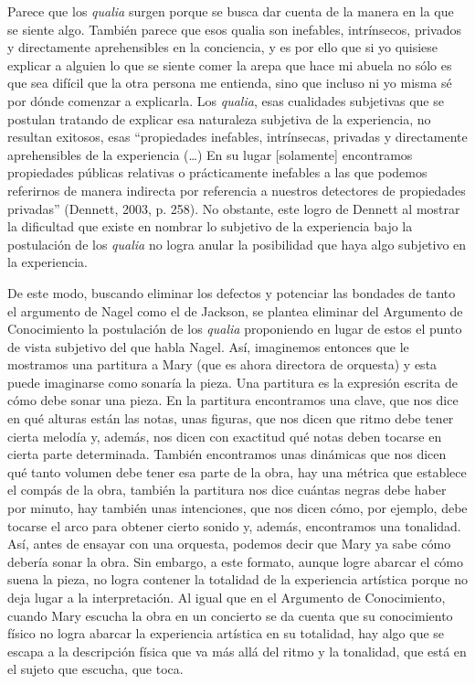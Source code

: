 \documentclass[]{book}
\begin{document}
\begin{refsection}
Parece que los \emph{qualia} surgen porque se busca dar cuenta de la
manera en la que se siente algo. También parece que esos qualia son
inefables, intrínsecos, privados y directamente aprehensibles en la
conciencia, y es por ello que si yo quisiese explicar a alguien lo que
se siente comer la arepa que hace mi abuela no sólo es que sea difícil
que la otra persona me entienda, sino que incluso ni yo misma sé por
dónde comenzar a explicarla. Los \emph{qualia}, esas cualidades
subjetivas que se postulan tratando de explicar esa naturaleza subjetiva
de la experiencia, no resultan exitosos, esas ``propiedades inefables,
intrínsecas, privadas y directamente aprehensibles de la experiencia
(\ldots{}) En su lugar {[}solamente{]} encontramos propiedades públicas
relativas o prácticamente inefables a las que podemos referirnos de
manera indirecta por referencia a nuestros detectores de propiedades
privadas'' (Dennett, 2003, p. 258). No obstante, este logro de Dennett
al mostrar la dificultad que existe en nombrar lo subjetivo de la
experiencia bajo la postulación de los \emph{qualia} no logra anular la
posibilidad que haya algo subjetivo en la experiencia.

De este modo, buscando eliminar los defectos y potenciar las bondades de
tanto el argumento de Nagel como el de Jackson, se plantea eliminar del
Argumento de Conocimiento la postulación de los \emph{qualia}
proponiendo en lugar de estos el punto de vista subjetivo del que habla
Nagel. Así, imaginemos entonces que le mostramos una partitura a Mary
(que es ahora directora de orquesta) y esta puede imaginarse como
sonaría la pieza. Una partitura es la expresión escrita de cómo debe
sonar una pieza. En la partitura encontramos una clave, que nos dice en
qué alturas están las notas, unas figuras, que nos dicen que ritmo debe
tener cierta melodía y, además, nos dicen con exactitud qué notas deben
tocarse en cierta parte determinada. También encontramos unas dinámicas
que nos dicen qué tanto volumen debe tener esa parte de la obra, hay una
métrica que establece el compás de la obra, también la partitura nos
dice cuántas negras debe haber por minuto, hay también unas intenciones,
que nos dicen cómo, por ejemplo, debe tocarse el arco para obtener
cierto sonido y, además, encontramos una tonalidad. Así, antes de
ensayar con una orquesta, podemos decir que Mary ya sabe cómo debería
sonar la obra. Sin embargo, a este formato, aunque logre abarcar el cómo
suena la pieza, no logra contener la totalidad de la experiencia
artística porque no deja lugar a la interpretación. Al igual que en el
Argumento de Conocimiento, cuando Mary escucha la obra en un concierto
se da cuenta que su conocimiento físico no logra abarcar la experiencia
artística en su totalidad, hay algo que se escapa a la descripción
física que va más allá del ritmo y la tonalidad, que está en el sujeto
que escucha, que toca.


\end{refsection}
\end{document}
